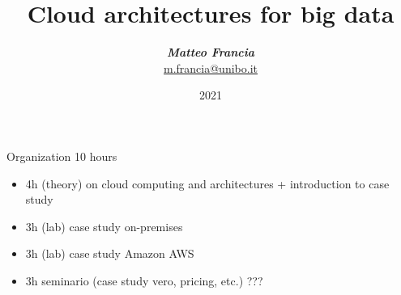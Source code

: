 \title[BigData (Module 2)]{Cloud architectures for big data}
\date[DOLAP]{2021}
\author[Matteo Francia (UniBO)]{
    \textit{\textbf{Matteo Francia}}\\
    \url{m.francia@unibo.it}
}

\begin{frame}
\titlepage
\end{frame}


\begin{frame}{Organization}
10 hours
\begin{itemize}
    \item  4h (theory) on cloud computing and architectures + introduction to case study
    \item  3h (lab) case study on-premises
    \item  3h (lab) case study Amazon AWS
    \item  3h seminario (case study vero, pricing, etc.) ???
\end{itemize}
\end{frame}

\frame{\tableofcontents}
\setlength{\parskip}{1em}



